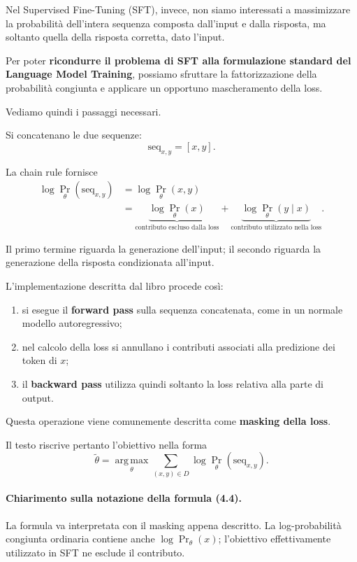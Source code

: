Nel Supervised Fine-Tuning (SFT), invece, non siamo interessati
a massimizzare la probabilità dell'intera sequenza composta
dall'input e dalla risposta, ma soltanto quella della risposta
corretta, dato l'input.

Per poter \textbf{ricondurre il problema di SFT alla formulazione
standard del Language Model Training}, possiamo sfruttare la
fattorizzazione della probabilità congiunta e applicare un
opportuno mascheramento della loss.

Vediamo quindi i passaggi necessari.

Si concatenano le due sequenze:
\[
\mathrm{seq}_{x,y}=[x,y].
\]

La chain rule fornisce
\[
\begin{aligned}
\log \Pr_{\theta}(\mathrm{seq}_{x,y})
&=
\log \Pr_{\theta}(x,y)\\
&=
\underbrace{\log \Pr_{\theta}(x)}_{
    \text{contributo escluso dalla loss}}
+
\underbrace{\log \Pr_{\theta}(y\mid x)}_{
    \text{contributo utilizzato nella loss}}.
\end{aligned}
\tag{4.3}
\]

Il primo termine riguarda la generazione dell'input;
il secondo riguarda la generazione della risposta
condizionata all'input.

L'implementazione descritta dal libro procede così:

\begin{enumerate}
    \item si esegue il \textbf{forward pass} sulla sequenza
    concatenata, come in un normale modello autoregressivo;

    \item nel calcolo della loss si annullano i contributi
    associati alla predizione dei token di $x$;

    \item il \textbf{backward pass} utilizza quindi soltanto
    la loss relativa alla parte di output.
\end{enumerate}

Questa operazione viene comunemente descritta come
\textbf{masking della loss}.

Il testo riscrive pertanto l'obiettivo nella forma
\[
\tilde{\theta}
=
\operatorname*{arg\,max}_{\theta}
\sum_{(x,y)\in D}
\log \Pr_{\theta}(\mathrm{seq}_{x,y}).
\tag{4.4}
\]

\paragraph{Chiarimento sulla notazione della formula (4.4).}
La formula va interpretata con il masking appena descritto.
La log-probabilità congiunta ordinaria contiene anche
$\log \Pr_{\theta}(x)$; l'obiettivo effettivamente utilizzato
in SFT ne esclude il contributo.

